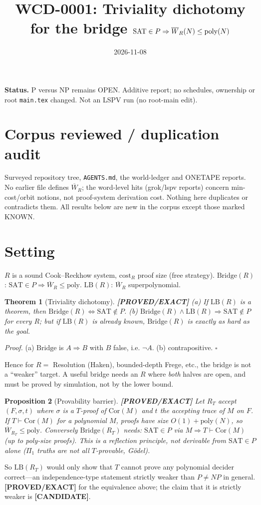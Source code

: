 \documentclass[11pt]{article}
\title{WCD-0001: Triviality dichotomy for the bridge $\SAT\in P\Rightarrow\overline W_R(N)\le\mathrm{poly}(N)$}
\date{2026-11-08}
\newtheorem{theorem}{Theorem}\newtheorem{proposition}[theorem]{Proposition}
\newcommand{\SAT}{\mathrm{SAT}}\newcommand{\status}[1]{\textbf{[#1]}}
\begin{document}
\maketitle
\noindent\textbf{Status.} P versus NP remains OPEN. Additive report; no schedules, ownership or root \texttt{main.tex} changed. Not an LSPV run (no root-main edit).

\section*{Corpus reviewed / duplication audit}
Surveyed repository tree, \texttt{AGENTS.md}, the world-ledger and ONETAPE reports. No earlier file defines $\overline W_R$; the word-level hits (grok/lspv reports) concern min-cost/orbit notions, not proof-system derivation cost. Nothing here duplicates or contradicts them. All results below are new in the corpus except those marked KNOWN.

\section{Setting}
$R$ is a sound Cook--Reckhow system, $\mathrm{cost}_R$ proof size (free strategy). $\mathrm{Bridge}(R)$: $\SAT\in P\Rightarrow\overline W_R\le\mathrm{poly}$. $\mathrm{LB}(R)$: $\overline W_R$ superpolynomial.

\begin{theorem}[Triviality dichotomy]\status{PROVED/EXACT}
(a) If $\mathrm{LB}(R)$ is a theorem, then $\mathrm{Bridge}(R)\iff \SAT\notin P$.
(b) $\mathrm{Bridge}(R)\wedge\mathrm{LB}(R)\Rightarrow \SAT\notin P$ for every $R$; but if $\mathrm{LB}(R)$ is already known, $\mathrm{Bridge}(R)$ is exactly as hard as the goal.
\end{theorem}
\emph{Proof.} (a) $\mathrm{Bridge}$ is $A\Rightarrow B$ with $B$ false, i.e. $\neg A$. (b) contrapositive. $\square$

Hence for $R=$ Resolution (Haken), bounded-depth Frege, etc., the bridge is not a ``weaker'' target. A useful bridge needs an $R$ where \emph{both} halves are open, and must be proved by simulation, not by the lower bound.

\begin{proposition}[Provability barrier]\status{PROVED/EXACT}
Let $R_T$ accept $(F,\sigma,t)$ where $\sigma$ is a $T$-proof of $\mathrm{Cor}(M)$ and $t$ the accepting trace of $M$ on $F$. If $T\vdash\mathrm{Cor}(M)$ for a polynomial $M$, proofs have size $O(1)+\mathrm{poly}(N)$, so $\overline W_{R_T}\le\mathrm{poly}$. Conversely $\mathrm{Bridge}(R_T)$ needs: $\SAT\in P$ via $M\Rightarrow T\vdash\mathrm{Cor}(M)$ (up to poly-size proofs). This is a reflection principle, not derivable from $\SAT\in P$ alone ($\Pi_1$ truths are not all $T$-provable, G\"odel).
\end{proposition}
So $\mathrm{LB}(R_T)$ would only show that $T$ cannot prove any polynomial decider correct---an independence-type statement strictly weaker than $P\ne NP$ in general. \status{PROVED/EXACT} for the equivalence above; the claim that it is strictly weaker is \status{CANDIDATE}.
\end{document}
